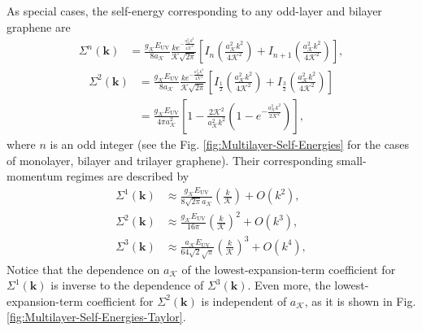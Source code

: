 \documentclass[english,aps,prd,nofootinbib,twocolumn]{revtex4-1}
\begin{document}
As special cases, the self-energy corresponding to any odd-layer and bilayer graphene are
\begin{equation}
\begin{split}
\!\!\!\!\Sigma^{n}\!(\mathbf{k })
\! &= \!
\frac{g_{\mathcal{K}}E_{\mathrm{UV}}}{8a_{\mathcal{K}}}
\frac{k e^{-\frac{a_{\mathcal{K}}^{2}k^{2}}{4\mathcal{K}^{2}}}}{\mathcal{K}\sqrt{2\pi}}
\!\!
\left[ 
\!
I_{n}\!\!
\left(\!
\frac{a_{\mathcal{K}}^{2}k^{2}}{4\mathcal{K}^{2}}
\!\right)
\!\! + \!
I_{n+1}\!\!
\left(\!
\frac{a_{\mathcal{K}}^{2}k^{2}}{4\mathcal{K}^{2}}
\!\right)
\!
\right]
\!
,
\end{split}
\end{equation}
\begin{equation}
\begin{split}
\Sigma^{2}(\mathbf{k })
\! &= \!
\frac{g_{\mathcal{K}}E_{\mathrm{UV}}}{8a_{\mathcal{K}}}
\frac{k e^{-\frac{a_{\mathcal{K}}^{2}k^{2}}{4\mathcal{K}^{2}}}}{\mathcal{K}\sqrt{2\pi}}
\!\!
\left[ 
I_{\frac{1}{2}}\!\!
\left(\!
\frac{a_{\mathcal{K}}^{2}k^{2}}{4\mathcal{K}^{2}}
\!\right)
\!\! + \!
I_{\frac{3}{2}}\!\!
\left(\!
\frac{a_{\mathcal{K}}^{2}k^{2}}{4\mathcal{K}^{2}}
\!\right)
\!
\right]
\! \\ &= \!
\frac{g_{\mathcal{K}}E_{\mathrm{UV}}}{4\pi a_{\mathcal{K}}^{2}}
\left[
1 - 
\frac{2\mathcal{K}^{2}}{a_{\mathcal{K}}^{2}k^{2}}
\left(
1-e^{-\frac{a_{\mathcal{K}}^{2}k^{2}}{2\mathcal{K}^{2}}}
\right)
\right]
\!
,
\end{split}
\end{equation}
where $n$ is an odd integer (see the Fig. \ref{fig:Multilayer-Self-Energies} for the cases of monolayer, bilayer and trilayer graphene). Their corresponding small-momentum regimes are described by
\begin{equation}
\begin{split}
\Sigma^{1}\!(\mathbf{k })
 &\approx 
\frac{g_{\mathcal{K}}E_{\mathrm{UV}}}
{8 \sqrt{2 \pi } a_{\mathcal{K}}}
\!
\left( \frac{k}{\mathcal{K}} \right)
+ O(k^{2})
, \\
\Sigma^{2}(\mathbf{k })
 &\approx 
\frac{g_{\mathcal{K}}E_{\mathrm{UV}}}
{16\pi }
\!\! 
\left( \frac{k}{\mathcal{K}} \right)^2
\!\!
+ O(k^{3})
, \\
\Sigma^{3}(\mathbf{k })
 &\approx 
\frac{a_{\mathcal{K}} E_{\mathrm{UV}}}
{64 \sqrt{2} \sqrt{\pi }}
\!\! 
\left( \frac{k}{\mathcal{K}} \right)^3
\!\!
+ O(k^{4})
,
\end{split}
\end{equation}
Notice that the dependence on $a_{\mathcal{K}}$ of the lowest-expansion-term coefficient for $\Sigma^{1}(\mathbf{k })$ is inverse to the dependence of $\Sigma^{3}(\mathbf{k })$. Even more, the lowest-expansion-term coefficient for $\Sigma^{2}(\mathbf{k })$ is independent of $a_{\mathcal{K}}$, as it is shown in Fig. \ref{fig:Multilayer-Self-Energies-Taylor}. 
\end{document}
